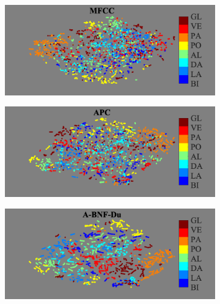 \documentclass[transmag]{IEEEtran}
\begin{document}
\begin{figure}[!t]
    \begin{subfigure}{0.49\linewidth}
	   \centering
	   \includegraphics[width=1\linewidth]{tsne_af_poa_mfcc_disc_bar_adjust_journal.png}
    \end{subfigure}
   \begin{subfigure}{0.49\linewidth}
	   \centering
	   \includegraphics[width=1\linewidth]{tsne_af_poa_apc_unlab_600_disc_bar_adjust_journal.png}
    \end{subfigure}
    \newline
   \begin{subfigure}{0.49\linewidth}
	   \centering
	   \includegraphics[width=1\linewidth]{tsne_af_poa_bnf_cgn_apc_input_disc_bar_adjust_journal.png}
    \end{subfigure}    \begin{subfigure}{0.49\linewidth}

\end{subfigure}
\end{figure}
\end{document}
